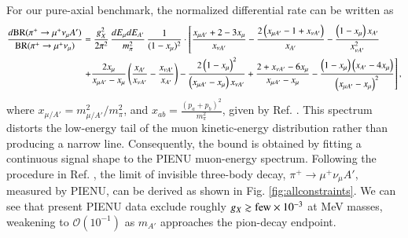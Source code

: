 \documentclass[onecolumn, aps, nofootinbib, prd, preprint, floats, floatfix, amsmath, amssymb, superscriptaddress, preprintnumbers]{revtex4-2}
\begin{document}
For our pure-axial benchmark, the normalized differential rate can be written as \cite{Altmannshofer:2026opc}
\begin{equation}\label{eq:pion-axial-spectrum}
\begin{aligned}
\frac{d{\rm BR}(\pi^+\to\mu^+\nu_\mu A')}
{{\rm BR}(\pi^+\to\mu^+\nu_\mu)}
&=\frac{g_X^2}{2\pi^2}\,
\frac{dE_\mu dE_{A'}}{m_\pi^2}\,
\frac{1}{(1-x_\mu)^2}\cdot \left[\frac{x_{\mu A'}+2-3 x_{\mu}}{x_{\nu A'}}-\frac{2\left(x_{\mu A'}-1+x_{\nu A'}\right)}{x_{A'}}-\frac{\left(1-x_{\mu}\right) x_{A'}}{x_{\nu A'}^2}\right.\\
& \left. +\frac{2 x_{\mu}}{x_{\mu A'}-x_{\mu}}\left(\frac{x_{A'}}{x_{\nu A'}}-\frac{x_{\nu A'}}{x_{A'}}\right) -\frac{2\left(1-x_{\mu}\right)^2}{\left(x_{\mu A'}-x_{\mu}\right) x_{\nu A'}}+\frac{2+x_{\nu A'}-6 x_{\mu}}{x_{\mu A'}-x_{\mu}}-\frac{\left(1-x_{\mu}\right)\left(x_{A'}-4 x_{\mu}\right)}{\left(x_{\mu A'}-x_{\mu}\right)^2}\right],
\end{aligned}
\end{equation}
where $x_{\mu/A'}=m_{\mu/A'}^2/m_\pi^2$, and $x_{a b}=\frac{(p_a+p_b)^2}{m_\pi^2}$, given by Ref. \cite{Altmannshofer:2026opc}. This spectrum distorts the low-energy tail of the muon kinetic-energy distribution rather than producing a narrow line. Consequently, the bound is obtained by fitting a continuous signal shape to the PIENU muon-energy spectrum. Following the procedure in Ref. \cite{Altmannshofer:2026opc}, the limit of invisible three-body decay, $\pi^+\to\mu^+\nu_\mu A'$, measured by PIENU, can be derived as shown in Fig. \ref{fig:allconstraints}.
We can see that present PIENU data exclude roughly $g_X\gtrsim{\rm few}\times10^{-3}$ at MeV masses, weakening to $\mathcal O(10^{-1})$ as $m_{A'}$ approaches the pion-decay endpoint.
\end{document}
